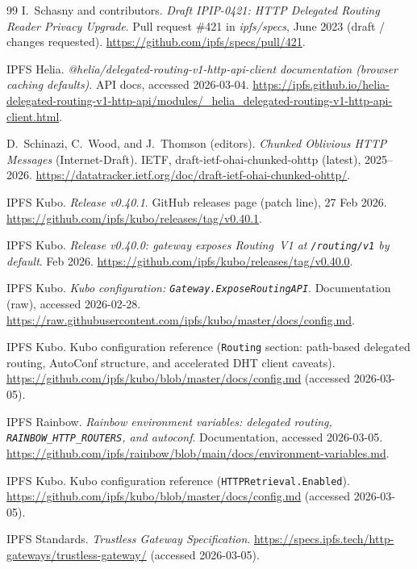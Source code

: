 \documentclass[11pt]{article}
\begin{document}
\begin{thebibliography}{99}
I.~Schasny and contributors.
\newblock \emph{Draft IPIP-0421: HTTP Delegated Routing Reader Privacy Upgrade}.
\newblock Pull request \#421 in \emph{ipfs/specs}, June 2023 (draft / changes requested).
\newblock \url{https://github.com/ipfs/specs/pull/421}.


IPFS Helia.
\newblock \emph{@helia/delegated-routing-v1-http-api-client documentation (browser caching defaults)}.
\newblock API docs, accessed 2026-03-04.
\newblock \url{https://ipfs.github.io/helia-delegated-routing-v1-http-api/modules/_helia_delegated-routing-v1-http-api-client.html}.

D.~Schinazi, C.~Wood, and J.~Thomson (editors).
\newblock \emph{Chunked Oblivious HTTP Messages} (Internet-Draft).
\newblock IETF, draft-ietf-ohai-chunked-ohttp (latest), 2025--2026.
\newblock \url{https://datatracker.ietf.org/doc/draft-ietf-ohai-chunked-ohttp/}.

IPFS Kubo.
\newblock \emph{Release v0.40.1}.
\newblock GitHub releases page (patch line), 27 Feb 2026.
\newblock \url{https://github.com/ipfs/kubo/releases/tag/v0.40.1}.

IPFS Kubo.
\newblock \emph{Release v0.40.0: gateway exposes Routing~V1 at \texttt{/routing/v1} by default}.
 Feb 2026.
\newblock \url{https://github.com/ipfs/kubo/releases/tag/v0.40.0}.

IPFS Kubo.
\newblock \emph{Kubo configuration: \texttt{Gateway.ExposeRoutingAPI}}.
\newblock Documentation (raw), accessed 2026-02-28.
\newblock \url{https://raw.githubusercontent.com/ipfs/kubo/master/docs/config.md}.

IPFS Kubo.
\newblock Kubo configuration reference (\texttt{Routing} section: path-based delegated routing, AutoConf structure, and accelerated DHT client caveats).
\newblock \url{https://github.com/ipfs/kubo/blob/master/docs/config.md} (accessed 2026-03-05).



IPFS Rainbow.
\newblock \emph{Rainbow environment variables: delegated routing, \texttt{RAINBOW\_HTTP\_ROUTERS}, and autoconf}.
\newblock Documentation, accessed 2026-03-05.
\newblock \url{https://github.com/ipfs/rainbow/blob/main/docs/environment-variables.md}.

IPFS Kubo.
\newblock Kubo configuration reference (\texttt{HTTPRetrieval.Enabled}).
\newblock \url{https://github.com/ipfs/kubo/blob/master/docs/config.md} (accessed 2026-03-05).

IPFS Standards.
\newblock \emph{Trustless Gateway Specification}.
\newblock \url{https://specs.ipfs.tech/http-gateways/trustless-gateway/} (accessed 2026-03-05).

\end{thebibliography}
\end{document}
